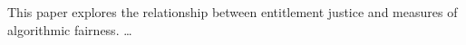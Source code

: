 This paper explores the relationship between entitlement justice and measures of
algorithmic fairness. \ldots